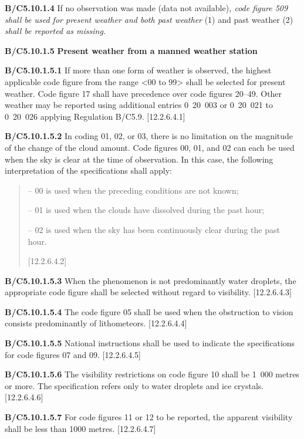 \textbf{B/C5.10.1.4} If no observation was made (data not available)\emph{, code figure 509 shall be used for present weather and both past weather} (1) and past weather (2) \emph{shall be reported as missing.}

\textbf{B/C5.10.1.5} \textbf{Present weather from a manned weather station}

\textbf{B/C5.10.1.5.1} If more than one form of weather is observed, the highest applicable code figure from the range \textless00 to 99\textgreater{} shall be selected for present weather. Code figure 17 shall have precedence over code figures 20--49. Other weather may be reported using additional entries 0~20~003 or 0~20~021 to 0~20~026 applying Regulation B/C5.9. {[}12.2.6.4.1{]}

\textbf{B/C5.10.1.5.2} In coding 01, 02, or 03, there is no limitation on the magnitude of the change of the cloud amount. Code figures 00, 01, and 02 can each be used when the sky is clear at the time of observation. In this case, the following interpretation of the specifications shall apply:

\begin{quote}
-- 00 is used when the preceding conditions are not known;

-- 01 is used when the clouds have dissolved during the past hour;

-- 02 is used when the sky has been continuously clear during the past hour.

{[}12.2.6.4.2{]}
\end{quote}

\textbf{B/C5.10.1.5.3} When the phenomenon is not predominantly water droplets, the appropriate code figure shall be selected without regard to visibility. {[}12.2.6.4.3{]}

\textbf{B/C5.10.1.5.4} The code figure 05 shall be used when the obstruction to vision consists predominantly of lithometeors. {[}12.2.6.4.4{]}

\textbf{B/C5.10.1.5.5} National instructions shall be used to indicate the specifications for code figures 07 and 09. {[}12.2.6.4.5{]}

\textbf{B/C5.10.1.5.6} The visibility restrictions on code figure 10 shall be 1~000 metres or more. The specification refers only to water droplets and ice crystals. {[}12.2.6.4.6{]}

\textbf{B/C5.10.1.5.7} For code figures 11 or 12 to be reported, the apparent visibility shall be less than 1000 metres. {[}12.2.6.4.7{]}

